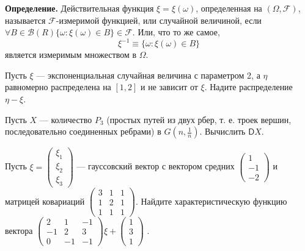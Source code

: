 \documentclass{article}
\begin{document}
\textbf{Определение.}
Действительная функция $\xi=\xi(\omega)$, определенная на $(\Omega, \mathscr F)$, называется $\mathscr F$-измеримой функцией, или случайной величиной, если 
$\forall B\in\mathscr B(R) \{\omega:\xi(\omega)\in B\}\in\mathscr F$.
Или, что то же самое, 
$$
\xi^{-1}\equiv\{\omega:\xi(\omega)\in B\}
$$
является измеримым множеством в $\Omega$.


Пусть $\xi$ --- экспоненциальная случайная величина с параметром 2, а $\eta$ равномерно распределена на $[1, 2]$ и не зависит от $\xi$. 
Надите распределение $\eta-\xi$.

Пусть $X$ --- количество $P_3$ (простых путей из двух рбер, т. е. троек вершин, последовательно соединенных ребрами) в $G(n,\frac{1}{n})$. Вычислить $\mathsf{D}X$.

Пусть 
$\xi = \begin{pmatrix}\xi_1\\\xi_2\\\xi_3\end{pmatrix}$ 
	--- гауссовский вектор с вектором средних 
	$\begin{pmatrix}1\\-1\\-2\end{pmatrix}$
		и матрицей ковариаций 
		$\begin{pmatrix}
			3&1&1\\
			1&2&1\\
			1&1&1
		\end{pmatrix}$.
		Найдите характеристическую функцию вектора
		$\begin{pmatrix}
			2&1&-1\\
			-1&2&3\\
			0&-1&-1
		\end{pmatrix}
		\xi +
		\begin{pmatrix}
			1\\
			3\\
			1
		\end{pmatrix}$
		.



		
\end{document}
